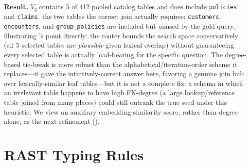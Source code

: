 \documentclass[twocolumn]{svjour3}
\begin{document}
\textbf{Result.} $V_q$ contains 5 of 412 pooled catalog tables and does include \texttt{policies} and \texttt{claims}, the two tables the correct join actually requires; \texttt{customers}, \texttt{encounters}, and \texttt{group\_policies} are included but unused by the gold query, illustrating 's point directly: the router bounds the search space conservatively (all 5 selected tables are \emph{plausible} given lexical overlap) without guaranteeing every selected table is actually load-bearing for the specific question. The degree-based tie-break is more robust than the alphabetical/iteration-order scheme it replaces---it gave the intuitively-correct answer here, favoring a genuine join hub over lexically-similar leaf tables---but it is not a complete fix: a schema in which an irrelevant table happens to have high FK-degree (a large lookup/reference table joined from many places) could still outrank the true seed under this heuristic. We view an auxiliary embedding-similarity score, rather than degree alone, as the next refinement ().

\section{RAST Typing Rules}
\label{sec:rast-typing}
\end{document}
